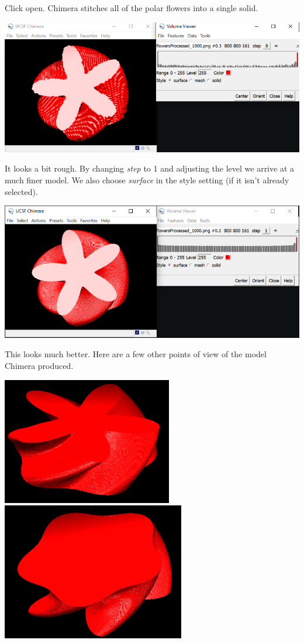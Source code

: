\documentclass[12 pt]{article}
\begin{document}
Click open.  Chimera stitches all of the polar flowers into a single solid.
\begin{center}
    \includegraphics[width = .6\paperwidth]{images/Chimera_Imported.png}
\end{center}
It looks a bit rough.  By changing \textit{step} to 1 and adjusting the level we arrive at a much finer model.  We also choose \textit{surface} in the style setting (if it isn't already selected).
\begin{center}
    \includegraphics[width = .6\paperwidth]{images/Chimera_Smoothed.PNG}
\end{center}
This looks much better.  Here are a few other points of view of the model Chimera produced.
\begin{center}
    \includegraphics[width=.3\paperwidth]{images/Chimera_Perspective01.PNG}\hspace{20pt}\includegraphics[width=.3\paperwidth]{images/Chimera_Perspective02.PNG}
\end{center}
\end{document}
